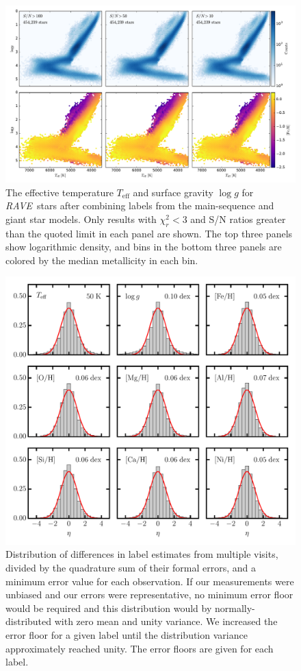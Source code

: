 \documentclass[preprint,trackchanges]{aastex}
\newcommand{\acronym}[1]{{\small{#1}}}
\newcommand{\project}[1]{\textsl{#1}}
\newcommand{\rave}{\project{\acronym{RAVE}}}
\newcommand{\teff}{T_{\mathrm{eff}}}
\newcommand{\logg}{\log g}
\begin{document}
\begin{figure}[p]
\includegraphics[width=\textwidth]{figures/hrd-test-set.pdf}
\caption{The effective temperature $\teff$ and surface gravity $\logg$ for \rave\ stars after combining labels from the main-sequence and giant star models.  Only results with $\chi_{r}^2 < 3$ and S/N ratios greater than the quoted limit in each panel are shown.  The top three panels show logarithmic density, and bins in the bottom three panels are colored by the median metallicity in each bin.\label{fig:test-set-hrd}}
\end{figure}


\begin{figure}[p]
\includegraphics[width=\textwidth]{figures/pairwise-metrics.pdf}
\caption{Distribution of differences in label estimates from multiple visits, divided by the quadrature sum of their formal errors, and a minimum error value for each observation.  If our measurements were unbiased and our errors were representative, no minimum error floor would be required and this distribution would by normally-distributed with zero mean and unity variance. 
We increased the error floor for a given label until the distribution variance approximately reached unity. The error floors are given for each label.\label{fig:pairwise-comparison}}
\end{figure}
\end{document}
